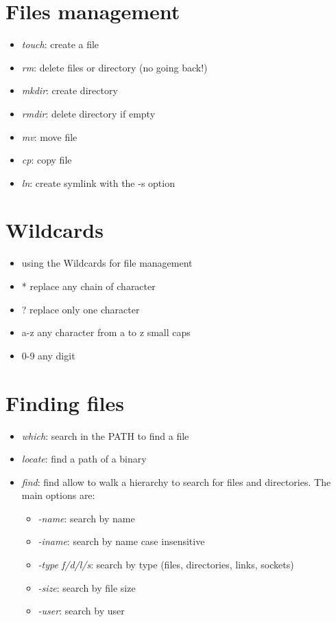 \documentclass[a4paper,12pts]{article}
\begin{document}
\section{Files management}
\begin{itemize}
    \item \textit{touch}: create a file
    \item \textit{rm}: delete files or directory (no going back!) 
    \item \textit{mkdir}: create directory
    \item \textit{rmdir}: delete directory if empty
    \item \textit{mv}: move file
    \item \textit{cp}: copy file
    \item \textit{ln}: create symlink with the -s option    
\end{itemize}

\section{Wildcards}
\begin{itemize}
    \item using the Wildcards for file management
    \item * replace any chain of character
    \item ? replace only one character
    \item a-z any character from a to z small caps
    \item 0-9 any digit
\end{itemize}

\section{Finding files}
\begin{itemize}
    \item \textit{which}: search in the PATH to find a file
    \item \textit{locate}: find a path of a binary
    \item \textit{find}: find allow to walk a hierarchy to search for files and
        directories. The main options are:
        \begin{itemize}
            \item \textit{-name}: search by name
            \item \textit{-iname}: search by name case insensitive
            \item \textit{-type f/d/l/s}: search by type (files, directories,
                links, sockets)
            \item \textit{-size}: search by file size
            \item \textit{-user}: search by user
        \end{itemize}
\end{itemize}
\end{document}
